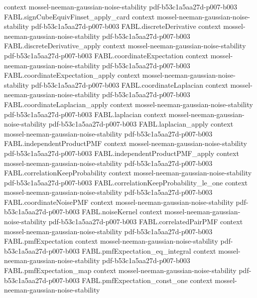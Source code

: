 \begin{theorem}
  {context}
  {mossel-neeman-gaussian-noise-stability}
  {pdf-b53c1a5aa27d-p007-b003}
\proofstep
  {FABL.signCubeEquivFinset_apply_card}
  {context}
  {mossel-neeman-gaussian-noise-stability}
  {pdf-b53c1a5aa27d-p007-b003}
\proofstep
  {FABL.discreteDerivative}
  {context}
  {mossel-neeman-gaussian-noise-stability}
  {pdf-b53c1a5aa27d-p007-b003}
\proofstep
  {FABL.discreteDerivative_apply}
  {context}
  {mossel-neeman-gaussian-noise-stability}
  {pdf-b53c1a5aa27d-p007-b003}
\proofstep
  {FABL.coordinateExpectation}
  {context}
  {mossel-neeman-gaussian-noise-stability}
  {pdf-b53c1a5aa27d-p007-b003}
\proofstep
  {FABL.coordinateExpectation_apply}
  {context}
  {mossel-neeman-gaussian-noise-stability}
  {pdf-b53c1a5aa27d-p007-b003}
\proofstep
  {FABL.coordinateLaplacian}
  {context}
  {mossel-neeman-gaussian-noise-stability}
  {pdf-b53c1a5aa27d-p007-b003}
\proofstep
  {FABL.coordinateLaplacian_apply}
  {context}
  {mossel-neeman-gaussian-noise-stability}
  {pdf-b53c1a5aa27d-p007-b003}
\proofstep
  {FABL.laplacian}
  {context}
  {mossel-neeman-gaussian-noise-stability}
  {pdf-b53c1a5aa27d-p007-b003}
\proofstep
  {FABL.laplacian_apply}
  {context}
  {mossel-neeman-gaussian-noise-stability}
  {pdf-b53c1a5aa27d-p007-b003}
\proofstep
  {FABL.independentProductPMF}
  {context}
  {mossel-neeman-gaussian-noise-stability}
  {pdf-b53c1a5aa27d-p007-b003}
\proofstep
  {FABL.independentProductPMF_apply}
  {context}
  {mossel-neeman-gaussian-noise-stability}
  {pdf-b53c1a5aa27d-p007-b003}
\proofstep
  {FABL.correlationKeepProbability}
  {context}
  {mossel-neeman-gaussian-noise-stability}
  {pdf-b53c1a5aa27d-p007-b003}
\proofstep
  {FABL.correlationKeepProbability_le_one}
  {context}
  {mossel-neeman-gaussian-noise-stability}
  {pdf-b53c1a5aa27d-p007-b003}
\proofstep
  {FABL.coordinateNoisePMF}
  {context}
  {mossel-neeman-gaussian-noise-stability}
  {pdf-b53c1a5aa27d-p007-b003}
\proofstep
  {FABL.noiseKernel}
  {context}
  {mossel-neeman-gaussian-noise-stability}
  {pdf-b53c1a5aa27d-p007-b003}
\proofstep
  {FABL.correlatedPairPMF}
  {context}
  {mossel-neeman-gaussian-noise-stability}
  {pdf-b53c1a5aa27d-p007-b003}
\proofstep
  {FABL.pmfExpectation}
  {context}
  {mossel-neeman-gaussian-noise-stability}
  {pdf-b53c1a5aa27d-p007-b003}
\proofstep
  {FABL.pmfExpectation_eq_integral}
  {context}
  {mossel-neeman-gaussian-noise-stability}
  {pdf-b53c1a5aa27d-p007-b003}
\proofstep
  {FABL.pmfExpectation_map}
  {context}
  {mossel-neeman-gaussian-noise-stability}
  {pdf-b53c1a5aa27d-p007-b003}
\proofstep
  {FABL.pmfExpectation_const_one}
  {context}
  {mossel-neeman-gaussian-noise-stability}

\end{theorem}
